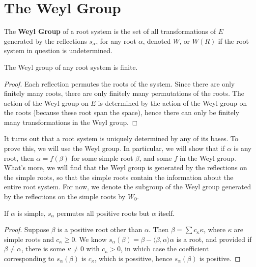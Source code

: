 \section{The Weyl Group}

The {\bf Weyl Group} of a root system is the set of all transformations of $E$ generated by the reflections $s_\alpha$, for any root $\alpha$, denoted $W$, or $W(R)$ if the root system in question is undetermined.

\begin{theorem}
    The Weyl group of any root system is finite.
\end{theorem}
\begin{proof}
    Each reflection permutes the roots of the system. Since there are only finitely many roots, there are only finitely many permutations of the roots. The action of the Weyl group on $E$ is determined by the action of the Weyl group on the roots (because these root span the space), hence there can only be finitely many transformations in the Weyl group.
\end{proof}

It turns out that a root system is uniquely determined by any of its bases. To prove this, we will use the Weyl group. In particular, we will show that if $\alpha$ is any root, then $\alpha = f(\beta)$ for some simple root $\beta$, and some $f$ in the Weyl group. What's more, we will find that the Weyl group is generated by the reflections on the simple roots, so that the simple roots contain the information about the entire root system. For now, we denote the subgroup of the Weyl group generated by the reflections on the simple roots by $W_0$.

\begin{lemma}
    If $\alpha$ is simple, $s_\alpha$ permutes all positive roots but $\alpha$ itself.
\end{lemma}
\begin{proof}
    Suppose $\beta$ is a positive root other than $\alpha$. Then $\beta = \sum c_\kappa \kappa$, where $\kappa$ are simple roots and $c_\kappa \geq 0$. We know $s_\alpha(\beta) = \beta - \langle \beta, \alpha \rangle \alpha$ is a root, and provided if $\beta \neq \alpha$, there is some $\kappa \neq 0$ with $c_\kappa > 0$, in which case the coefficient corresponding to $s_\alpha(\beta)$ is $c_\kappa$, which is possitive, hence $s_\alpha(\beta)$ is positive.
\end{proof}

